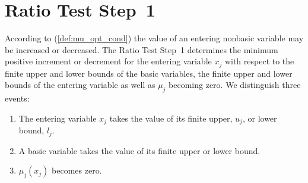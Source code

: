 \documentclass[a4paper]{article}
\begin{document}
\section{Ratio Test Step~1}
According to (\ref{def:mu_opt_cond}) the value of an entering nonbasic variable may be increased or decreased.
The Ratio Test Step~1 determines the minimum positive increment or decrement for the entering variable $x_{j}$ with respect to the finite upper and lower bounds of the basic variables, the finite upper and lower bounds of the entering variable as well as $\mu_{j}$ becoming zero. We distinguish three events:
\begin{enumerate}
\item The entering variable $x_{j}$ takes the value of its finite upper,
$u_{j}$, or lower bound, $l_{j}$.
\item A basic variable takes the value of its finite upper or lower bound.
\item $\mu_{j}(x_{j})$ becomes zero.
\end{enumerate}
\end{document}

